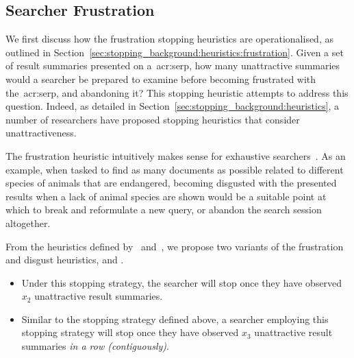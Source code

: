 \subsection{Searcher Frustration}\label{sec:strategies:frus_disg:frustration}
We first discuss how the frustration stopping heuristics are operationalised, as outlined in Section~\ref{sec:stopping_background:heuristics:frustration}. Given a set of result summaries presented on a~\gls{acr:serp}, how many unattractive summaries would a searcher be prepared to examine before becoming frustrated with the~\gls{acr:serp}, and abandoning it? This stopping heuristic attempts to address this question. Indeed, as detailed in Section~\ref{sec:stopping_background:heuristics}, a number of researchers have proposed stopping heuristics that consider unattractiveness.

The frustration heuristic intuitively makes sense for exhaustive searchers~\citep{kraft1979stopping_rules}. As an example, when tasked to find as many documents as possible related to different species of animals that are endangered, becoming disgusted with the presented results when a lack of animal species are shown would be a suitable point at which to break and reformulate a new query, or abandon the search session altogether.

From the heuristics defined by~\cite{cooper1973retrieval_effectiveness_ii} and~\cite{kraft1979stopping_rules}, we propose two variants of the frustration and disgust heuristics,  and .

\begin{itemize}
    \item{ Under this stopping strategy, the searcher will stop once they have observed $x_2$ unattractive result summaries.}
    
    \item{ Similar to the stopping strategy defined above, a searcher employing this stopping strategy will stop once they have observed $x_3$ unattractive result summaries \emph{in a row (contiguously)}.}
\end{itemize}

